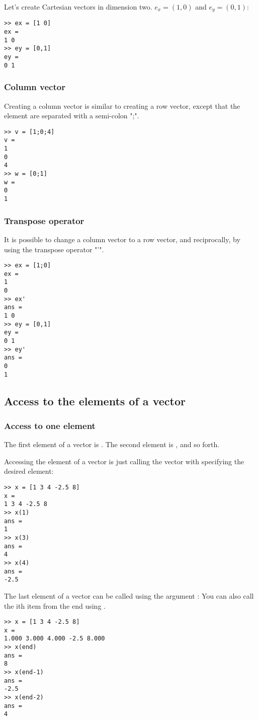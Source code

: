 			Let's create Cartesian vectors in dimension two. $e_x = (1,0)$ and $e_y = (0,1)$:
\begin{lstlisting}
>> ex = [1 0]
ex =
1 0
>> ey = [0,1]
ey =
0 1
\end{lstlisting}
 
		\subsubsection{Column vector}
			Creating a column vector is similar to creating a row vector, except that the element are separated with a semi-colon ";".
\begin{lstlisting}
>> v = [1;0;4]
v =
1
0
4
>> w = [0;1]
w =
0
1
\end{lstlisting}

		\subsubsection{Transpose operator}
			It is possible to change a column vector to a row vector, and reciprocally, by using the transpose operator "'".
\begin{lstlisting}
>> ex = [1;0]
ex =
1
0
>> ex'
ans =
1 0
>> ey = [0,1]
ey =
0 1
>> ey'
ans =
0
1
\end{lstlisting}

	\subsection{Access to the elements of a vector}
		\subsubsection{Access to one element}
			The first element of a vector  is .
			The second element is , and so forth.

			Accessing the element of a vector is just calling the vector with specifying the desired element:
\begin{lstlisting}
>> x = [1 3 4 -2.5 8]
x = 
1 3 4 -2.5 8
>> x(1)
ans = 
1
>> x(3)
ans = 
4
>> x(4)
ans = 
-2.5
\end{lstlisting}
			The last element of a vector can be called using the argument :
			You can also call the ith item from the end using . 
\begin{lstlisting}
>> x = [1 3 4 -2.5 8]
x = 
1.000 3.000 4.000 -2.5 8.000
>> x(end)
ans = 
8
>> x(end-1)
ans = 
-2.5
>> x(end-2)
ans = 
4
\end{lstlisting}

